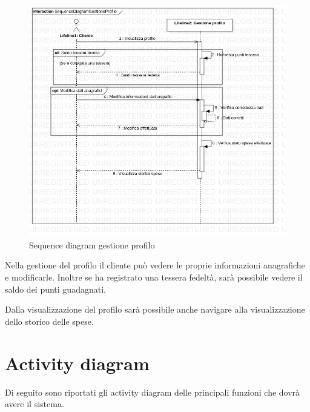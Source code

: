 \documentclass[12pt, a4paper]{article}
\begin{document}
\begin{figure}[H]
\centering
\includegraphics[width=\linewidth]{Use Case Model!Gestione profilo!InteractionGestioneProfilo!SequenceDiagramGestioneProfilo_5.png}
\caption{Sequence diagram gestione profilo}
\end{figure}

Nella gestione del profilo il cliente può vedere le proprie informazioni 
anagrafiche e modificarle. Inoltre se ha registrato una tessera fedeltà, sarà
possibile vedere il saldo dei punti guadagnati.

Dalla visualizzazione del profilo sarà possibile anche navigare alla
visualizzazione dello storico delle spese.

\newpage

\section{Activity diagram}
Di seguito sono riportati gli activity diagram delle principali funzioni che dovrà avere il sistema.

\end{document}

